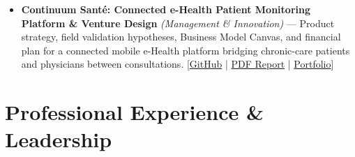 \documentclass[10pt,a4paper]{article}
\begin{document}
\begin{itemize}
\item \textbf{Continuum Santé: Connected e-Health Patient Monitoring Platform \& Venture Design} \textit{(Management \& Innovation)} --- Product strategy, field validation hypotheses, Business Model Canvas, and financial plan for a connected mobile e-Health platform bridging chronic-care patients and physicians between consultations. [\href{https://github.com/scidelo-andriasahy/continuum-sante-connected-health-platform}{GitHub} | \href{https://scidelo-andriasahy.github.io/assets/pdfs/Rapport_Continuum_Sante.pdf}{PDF Report} | \href{https://scidelo-andriasahy.github.io/?project=19}{Portfolio}]
\end{itemize}
\section*{Professional Experience \& Leadership}
\end{document}
